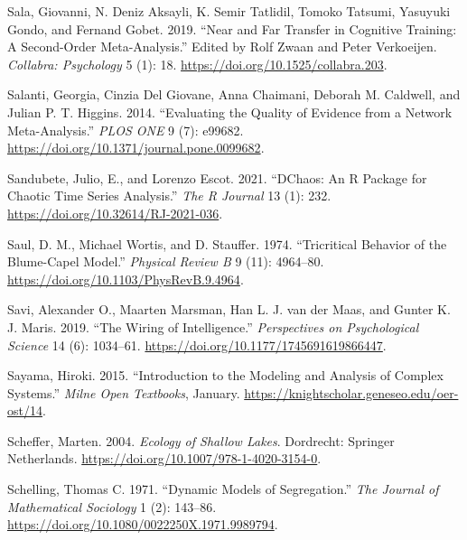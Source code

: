 \documentclass[
  a4paper,
  DIV=11,
  numbers=noendperiod,
  oneside]{scrreprt}
\newlength{\cslhangindent}
\newlength{\cslentryspacingunit} %
\newenvironment{CSLReferences}[2] %
 {%
  \setlength{\parindent}{0pt}
  \ifodd #1
  \let\oldpar\par
  \def\par{\hangindent=\cslhangindent\oldpar}
  \fi
  \setlength{\parskip}{#2\cslentryspacingunit}
 }%
 {}
\begin{document}
\begin{CSLReferences}{1}{0}
\leavevmode{}%
Sala, Giovanni, N. Deniz Aksayli, K. Semir Tatlidil, Tomoko Tatsumi,
Yasuyuki Gondo, and Fernand Gobet. 2019. {``Near and {Far Transfer} in
{Cognitive Training}: {A Second-Order Meta-Analysis}.''} Edited by Rolf
Zwaan and Peter Verkoeijen. \emph{Collabra: Psychology} 5 (1): 18.
\url{https://doi.org/10.1525/collabra.203}.

\leavevmode{}%
Salanti, Georgia, Cinzia Del Giovane, Anna Chaimani, Deborah M.
Caldwell, and Julian P. T. Higgins. 2014. {``Evaluating the Quality of
Evidence from a Network Meta-Analysis.''} \emph{PLOS ONE} 9 (7): e99682.
\url{https://doi.org/10.1371/journal.pone.0099682}.

\leavevmode{}%
Sandubete, Julio, E., and Lorenzo Escot. 2021. {``{DChaos}: {An R
Package} for {Chaotic Time Series Analysis}.''} \emph{The R Journal} 13
(1): 232. \url{https://doi.org/10.32614/RJ-2021-036}.

\leavevmode{}%
Saul, D. M., Michael Wortis, and D. Stauffer. 1974. {``Tricritical
Behavior of the {Blume-Capel} Model.''} \emph{Physical Review B} 9 (11):
4964--80. \url{https://doi.org/10.1103/PhysRevB.9.4964}.

\leavevmode{}%
Savi, Alexander O., Maarten Marsman, Han L. J. van der Maas, and Gunter
K. J. Maris. 2019. {``The {Wiring} of {Intelligence}.''}
\emph{Perspectives on Psychological Science} 14 (6): 1034--61.
\url{https://doi.org/10.1177/1745691619866447}.

\leavevmode{}%
Sayama, Hiroki. 2015. {``Introduction to the Modeling and Analysis of
Complex Systems.''} \emph{Milne Open Textbooks}, January.
\url{https://knightscholar.geneseo.edu/oer-ost/14}.

\leavevmode{}%
Scheffer, Marten. 2004. \emph{Ecology of {Shallow Lakes}}. {Dordrecht}:
{Springer Netherlands}. \url{https://doi.org/10.1007/978-1-4020-3154-0}.

\leavevmode{}%
Schelling, Thomas C. 1971. {``Dynamic Models of Segregation.''}
\emph{The Journal of Mathematical Sociology} 1 (2): 143--86.
\url{https://doi.org/10.1080/0022250X.1971.9989794}.


\end{CSLReferences}
\end{document}
